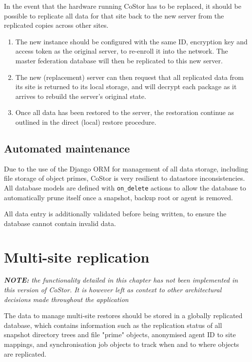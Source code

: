 \documentclass[bsc,frontabs,twoside,singlespacing,parskip,deptreport]{infthesis}     %
\begin{document}
In the event that the hardware running CoStor has to be replaced, it should be possible to replicate
all data for that site back to the new server from the replicated copies across other sites.

\begin{enumerate}
	\item The new instance should be configured with the same ID, encryption key and access 
	token as the original server, to re-enroll it into the network. The master federation 
	database will then be replicated to this new server.
	\item The new (replacement) server can then request that all replicated data from its site
	is returned to its local storage, and will decrypt each package as it arrives to rebuild
	the server's original state.
	\item Once all data has been restored to the server, the restoration continue as outlined
	in the direct (local) restore procedure.
\end{enumerate}

\section{Automated maintenance}

Due to the use of the Django ORM for management of all data storage, including file storage
of object primes, CoStor is very resilient to datastore inconsistencies. All database models
are defined with \texttt{on\_delete} actions to allow the database to automatically prune
itself once a snapshot, backup root or agent is removed.

All data entry is additionally validated before being written, to ensure the database cannot
contain invalid data.

\chapter{Multi-site replication}
\label{chap:multisite}

\textit{\textbf{NOTE:} the functionality detailed in this chapter has not been implemented in this version of CoStor. It is however left as context to other architectural decisions made throughout the application}

The data to manage multi-site restores should be stored in a globally replicated database, which 
contains information such as the replication status of all snapshot directory trees and file 
"prime" objects, anonymised agent ID to site mappings, and synchronisation job objects to track
when and to where objects are replicated.
\end{document}
